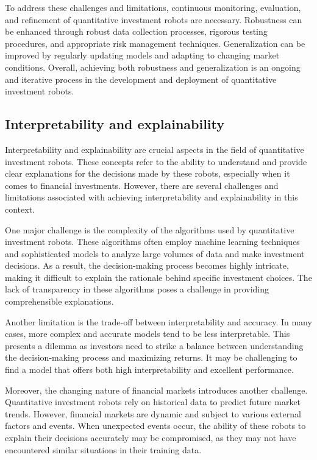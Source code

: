 \documentclass[UTF8]{ctexart}
\begin{document}
To address these challenges and limitations, continuous monitoring, evaluation, and refinement of quantitative investment robots are necessary. Robustness can be enhanced through robust data collection processes, rigorous testing procedures, and appropriate risk management techniques. Generalization can be improved by regularly updating models and adapting to changing market conditions. Overall, achieving both robustness and generalization is an ongoing and iterative process in the development and deployment of quantitative investment robots.

\subsection{Interpretability and explainability}
Interpretability and explainability are crucial aspects in the field of quantitative investment robots. These concepts refer to the ability to understand and provide clear explanations for the decisions made by these robots, especially when it comes to financial investments. However, there are several challenges and limitations associated with achieving interpretability and explainability in this context.

One major challenge is the complexity of the algorithms used by quantitative investment robots. These algorithms often employ machine learning techniques and sophisticated models to analyze large volumes of data and make investment decisions. As a result, the decision-making process becomes highly intricate, making it difficult to explain the rationale behind specific investment choices. The lack of transparency in these algorithms poses a challenge in providing comprehensible explanations.

Another limitation is the trade-off between interpretability and accuracy. In many cases, more complex and accurate models tend to be less interpretable. This presents a dilemma as investors need to strike a balance between understanding the decision-making process and maximizing returns. It may be challenging to find a model that offers both high interpretability and excellent performance.

Moreover, the changing nature of financial markets introduces another challenge. Quantitative investment robots rely on historical data to predict future market trends. However, financial markets are dynamic and subject to various external factors and events. When unexpected events occur, the ability of these robots to explain their decisions accurately may be compromised, as they may not have encountered similar situations in their training data.
\end{document}
